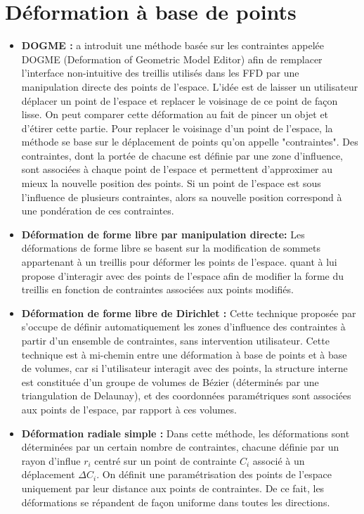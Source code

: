 \section{Déformation à base de points}
\begin{itemize}
\item{\textbf{DOGME :}} \cite{BB91} a introduit une méthode basée sur
  les contraintes appelée DOGME (Deformation of Geometric Model
  Editor) afin de remplacer l'interface non-intuitive des treillis
  utilisés dans les FFD par une manipulation directe des points de
  l'espace. L'idée est de laisser un utilisateur déplacer un point de
  l'espace et replacer le voisinage de ce point de façon lisse. On
  peut comparer cette déformation au fait de pincer un objet et
  d'étirer cette partie. Pour replacer le voisinage d'un point de
  l'espace, la méthode se base sur le déplacement de points qu'on
  appelle "contraintes". Des contraintes, dont la portée de chacune
  est définie par une zone d'influence, sont associées à chaque point
  de l'espace et permettent d'approximer au mieux la nouvelle position
  des points. Si un point de l'espace est sous l'influence de
  plusieurs contraintes, alors sa nouvelle position correspond à une
  pondération de ces contraintes.
\item{\textbf{Déformation de forme libre par manipulation directe:}}
  Les déformations de forme libre se basent sur la modification de
  sommets appartenant à un treillis pour déformer les points de
  l'espace. \cite{HHK92} quant à lui propose d'interagir avec des
  points de l'espace afin de modifier la forme du treillis en fonction
  de contraintes associées aux points modifiés.
\item{\textbf{Déformation de forme libre de Dirichlet :}} Cette
  technique proposée par \cite{MT97} s'occupe de définir
  automatiquement les zones d'influence des contraintes à partir d'un
  ensemble de contraintes, sans intervention utilisateur. Cette
  technique est à mi-chemin entre une déformation à base de points et
  à base de volumes, car si l'utilisateur interagit avec des points,
  la structure interne est constituée d'un groupe de volumes de Bézier
  (déterminés par une triangulation de Delaunay), et des coordonnées
  paramétriques sont associées aux points de l'espace, par rapport à
  ces volumes.
\item{\textbf{Déformation radiale simple :}} Dans cette méthode, les
  déformations sont déterminées par un certain nombre de contraintes,
  chacune définie par un rayon d'influe $r_i$ centré sur un point de
  contrainte $C_i$ associé à un déplacement $\Delta C_i$. On définit
  une paramétrisation des points de l'espace uniquement par leur
  distance aux points de contraintes. De ce fait, les déformations se
  répandent de façon uniforme dans toutes les directions.
\end{itemize}


